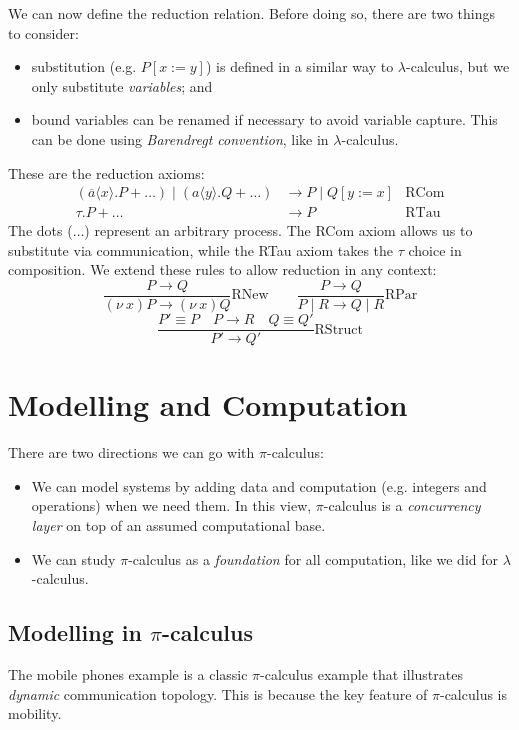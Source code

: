 \documentclass[a4paper, openany]{memoir}
\theoremstyle{definition}
\begin{document}
    We can now define the reduction relation. Before doing so, there are two things to consider:
    \begin{itemize}
        \item substitution (e.g. $P[x := y]$) is defined in a similar way to $\lambda$-calculus, but we only substitute \emph{variables}; and
        \item bound variables can be renamed if necessary to avoid variable capture. This can be done using \emph{Barendregt convention}, like in $\lambda$-calculus.
    \end{itemize}
    These are the reduction axioms:
    \begin{align*}
        (\overline{a} \langle x \rangle.P + \dots) \mid (a \langle y \rangle.Q + \dots) &\to P \mid Q[ y:= x] & \textrm{RCom} \\
        \tau.P + \dots &\to P & \textrm{RTau}
    \end{align*}
    The dots ($\dots$) represent an arbitrary process. The RCom axiom allows us to substitute via communication, while the RTau axiom takes the $\tau$ choice in composition. We extend these rules to allow reduction in any context:
    \[\frac{P \to Q}{(\nu \ x)P \to (\nu \ x)Q} \textrm{RNew} \qquad \frac{P \to Q}{P \mid R \to Q \mid R} \textrm{RPar}\]
    \[\frac{P' \equiv P \quad P \to R \quad Q \equiv Q'}{P' \to Q'} \textrm{RStruct}\]
    \newpage

    \section{Modelling and Computation}
    There are two directions we can go with $\pi$-calculus:
    \begin{itemize}
        \item We can model systems by adding data and computation (e.g. integers and operations) when we need them. In this view, $\pi$-calculus is a \emph{concurrency layer} on top of an assumed computational base.
        \item We can study $\pi$-calculus as a \emph{foundation} for all computation, like we did for $\lambda$-calculus.
    \end{itemize}
    
    \subsection{Modelling in $\pi$-calculus}
    The mobile phones example is a classic $\pi$-calculus example that illustrates \emph{dynamic} communication topology. This is because the key feature of $\pi$-calculus is mobility.
\end{document}
